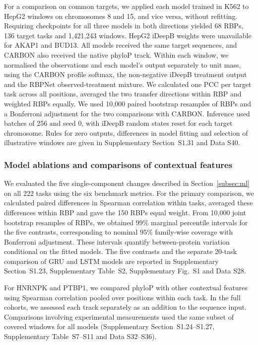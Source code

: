 \documentclass[webpdf,contemporary,large]{current_assets/oup-authoring-template}
\newcommand{\supfig}[1]{Supplementary Fig.~#1}
\newcommand{\suptab}[1]{Supplementary Table~#1}
\newcommand{\supsect}[1]{Supplementary Section~#1}
\begin{document}
For a comparison on common targets, we applied each model trained in K562 to HepG2 windows on chromosomes 8 and 15, and vice versa, without refitting. Requiring checkpoints for all three models in both directions yielded 68 RBPs, 136 target tasks and 1,421,243 windows. HepG2 iDeepB weights were unavailable for AKAP1 and BUD13. All models received the same target sequences, and CARBON also received the native phyloP track. Within each window, we normalised the observations and each model's output separately to unit mass, using the CARBON profile softmax, the non-negative iDeepB treatment output and the RBPNet observed-treatment mixture. We calculated one PCC per target task across all positions, averaged the two transfer directions within RBP and weighted RBPs equally. We used 10,000 paired bootstrap resamples of RBPs and a Bonferroni adjustment for the two comparisons with CARBON. Inference used batches of 256 and seed 0, with iDeepB random states reset for each target chromosome. Rules for zero outputs, differences in model fitting and selection of illustrative windows are given in \supsect{S1.31} and Data S40.

\subsubsection{Model ablations and comparisons of contextual features}\label{subsec:component_context}

We evaluated the five single-component changes described in Section~\ref{subsec:ml} on all 222 tasks using the six benchmark metrics. For the primary comparison, we calculated paired differences in Spearman correlation within tasks, averaged these differences within RBP and gave the 150 RBPs equal weight. From 10,000 joint bootstrap resamples of RBPs, we obtained 99\% marginal percentile intervals for the five contrasts, corresponding to nominal 95\% family-wise coverage with Bonferroni adjustment. These intervals quantify between-protein variation conditional on the fitted models. The five contrasts and the separate 20-task comparison of GRU and LSTM models are reported in \supsect{S1.23}, \suptab{S2}, \supfig{S1} and Data S28.

For HNRNPK and PTBP1, we compared phyloP with other contextual features using Spearman correlation pooled over positions within each task. In the full cohorts, we assessed each track separately as an addition to the sequence input. Comparisons involving experimental measurements used the same subset of covered windows for all models (\supsect{S1.24--S1.27}, \suptab{S7--S11} and Data S32--S36).
\end{document}

